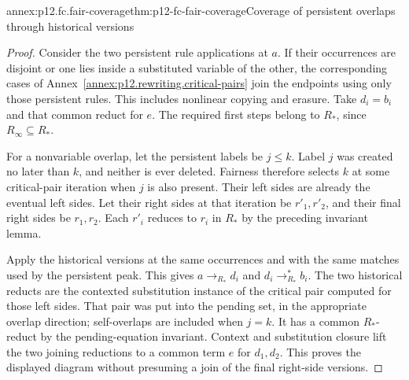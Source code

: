 \begin{annexitem}{annex:p12.fc.fair-coverage}{thm:p12-fc-fair-coverage}{Coverage of persistent overlaps through historical versions}
\begin{proof}
Consider the two persistent rule applications at \(a\).
If their occurrences are disjoint or one lies inside a substituted
variable of the other, the corresponding cases of
Annex~\ref{annex:p12.rewriting.critical-pairs} join the endpoints
using only those persistent rules. This includes nonlinear copying
and erasure. Take \(d_i=b_i\) and that common reduct for \(e\).
The required first steps belong to \(R_*\), since
\(R_\infty\subseteq R_*\).

For a nonvariable overlap, let the persistent labels be \(j\leq k\).
Label \(j\) was created no later than \(k\), and neither is
ever deleted. Fairness therefore selects \(k\) at some
critical-pair iteration when \(j\) is also present. Their
left sides are already the eventual left sides. Let their right
sides at that iteration be \(r'_1,r'_2\), and their final
right sides be \(r_1,r_2\). Each \(r'_i\) reduces to \(r_i\)
in \(R_*\) by the preceding invariant lemma.

Apply the historical versions at the same occurrences and with the
same matches used by the persistent peak. This gives
\(a\to_{R_*}d_i\) and \(d_i\to_{R_*}^*b_i\).
The two historical reducts are the contexted substitution instance
of the critical pair computed for those left sides. That pair
was put into the pending set, in the appropriate overlap direction;
self-overlaps are included when \(j=k\). It has a common
\(R_*\)-reduct by the pending-equation invariant. Context and
substitution closure lift the two joining reductions to a common
term \(e\) for \(d_1,d_2\). This proves the displayed diagram
without presuming a join of the final right-side versions.
\end{proof}
\end{annexitem}

